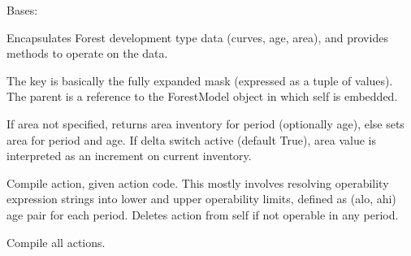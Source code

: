 \documentclass[letterpaper,10pt,english]{sphinxmanual}
\begin{document}
\begin{fulllineitems}
\label{\detokenize{forest:forest.DevelopmentType}}
Bases: 

Encapsulates Forest development type data (curves, age, area), and provides methods to operate on the data.

The key is basically the fully expanded mask (expressed as a tuple of values). The parent is a reference to the ForestModel object in which self is embedded.

\begin{fulllineitems}
\label{\detokenize{forest:forest.DevelopmentType.add_ycomp}}
\end{fulllineitems}


\begin{fulllineitems}
\label{\detokenize{forest:forest.DevelopmentType.area}}
If area not specified, returns area inventory for period (optionally age), else sets area for period and age. 
If delta switch active (default True), area value is interpreted as an increment on current inventory.

\end{fulllineitems}


\begin{fulllineitems}
\label{\detokenize{forest:forest.DevelopmentType.compile_action}}
Compile action, given action code. 
This mostly involves resolving operability expression strings into
lower and upper operability limits, defined as (alo, ahi) age pair for each period.
Deletes action from self if not operable in any period.

\end{fulllineitems}


\begin{fulllineitems}
\label{\detokenize{forest:forest.DevelopmentType.compile_actions}}
Compile all actions.


\end{fulllineitems}
\end{fulllineitems}
\end{document}
